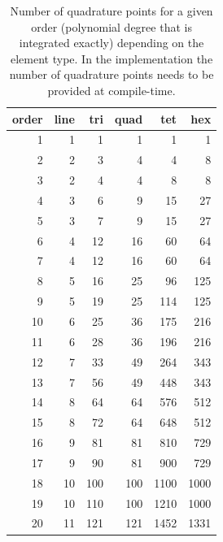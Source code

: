 \documentclass[a4paper,12pt]{article}
\theoremstyle{definition}
\begin{document}
\begin{table}
\caption{Number of quadrature points for a given order (polynomial
  degree that is integrated exactly) depending on the element type. In
the implementation the number of quadrature points needs to be
provided at compile-time.}
\label{table:quadrature}
\begin{center}
\begin{tabular}{rrrrrr}
\hline
order & line & tri & quad & tet & hex \\
 \hline
    1  &  1 &   1  &   1   &   1    &   1        \\
    2  & 2  &   3  &   4    &  4    &   8        \\
    3 &  2 &    4  &   4    &  8    &   8        \\
    4 &  3 &    6  &   9    &  15   &   27       \\
    5  & 3  &   7  &   9    &  15   &   27       \\
    6 &  4 &    12  &  16  &   60  &  64     \\
    7  &  4 &   12 &   16   &  60  &  64     \\
    8  & 5  &   16 &   25    & 96  &  125    \\
    9  &  5 &   19  &  25   &   114 & 125    \\
    10  & 6  &   25 &   36  &  175 & 216   \\
    11  &  6 &   28 &   36  &  196 & 216   \\
    12 & 7  &    33 &   49  &  264 & 343   \\
    13 & 7  &    56 &   49  &  448 & 343   \\
    14  & 8  &   64 &   64  &  576 & 512   \\
    15  &  8 &   72 &   64  &  648 & 512   \\
    16 & 9  &    81 &   81  &  810 & 729   \\
    17 &  9 &    90 &   81  &  900 & 729   \\
    18  & 10  &   100 &  100 &  1100 & 1000\\
    19 &  10 &    110 &  100  & 1210 & 1000\\
  20   &  11 &  121  & 121   &  1452 & 1331\\
  \hline
\end{tabular}
\end{center}
\end{table}



\end{document}
